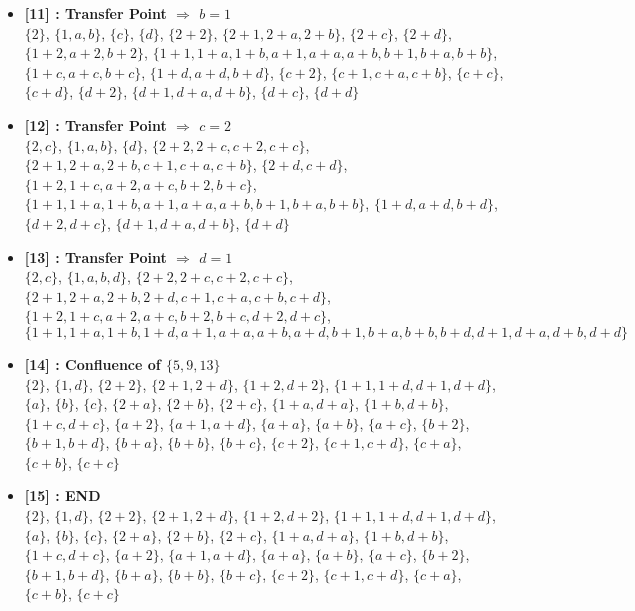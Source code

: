 \begin{itemize}
    \item \textbf{[11] : Transfer Point $\Rightarrow$ $b = 1$}\\
        $\{2\}$, $\{1, a, b\}$, $\{c\}$, $\{d\}$, $\{2 + 2\}$, $\{2 + 1, 2 + a, 2 + b\}$, $\{2 + c\}$, $\{2 + d\}$, $\{1 + 2, a + 2, b + 2\}$, $\{1 + 1, 1 + a, 1 + b, a + 1, a + a, a + b, b + 1, b + a, b + b\}$, $\{1 + c, a + c, b + c\}$, $\{1 + d, a + d, b + d\}$, $\{c + 2\}$, $\{c + 1, c + a, c + b\}$, $\{c + c\}$, $\{c + d\}$, $\{d + 2\}$, $\{d + 1, d + a, d + b\}$, $\{d + c\}$, $\{d + d\}$

    \item \textbf{[12] : Transfer Point $\Rightarrow$ $c = 2$}\\
        $\{2, c\}$, $\{1, a, b\}$, $\{d\}$, $\{2 + 2, 2 + c, c + 2, c + c\}$, $\{2 + 1, 2 + a, 2 + b, c + 1, c + a, c + b\}$, $\{2 + d, c + d\}$, $\{1 + 2, 1 + c, a + 2, a + c, b + 2, b + c\}$, $\{1 + 1, 1 + a, 1 + b, a + 1, a + a, a + b, b + 1, b + a, b + b\}$, $\{1 + d, a + d, b + d\}$, $\{d + 2, d + c\}$, $\{d + 1, d + a, d + b\}$, $\{d + d\}$

    \item \textbf{[13] : Transfer Point $\Rightarrow$ $d = 1$}\\
        $\{2, c\}$, $\{1, a, b, d\}$, $\{2 + 2, 2 + c, c + 2, c + c\}$, $\{2 + 1, 2 + a, 2 + b, 2 + d, c + 1, c + a, c + b, c + d\}$, $\{1 + 2, 1 + c, a + 2, a + c, b + 2, b + c, d + 2, d + c\}$, $\{1 + 1, 1 + a, 1 + b, 1 + d, a + 1, a + a, a + b, a + d, b + 1, b + a, b + b, b + d, d + 1, d + a, d + b, d + d\}$

    \item \textbf{[14] : Confluence of $\{5, 9, 13\}$}\\
        $\{2\}$, $\{1, d\}$, $\{2 + 2\}$, $\{2 + 1, 2 + d\}$, $\{1 + 2, d + 2\}$, $\{1 + 1, 1 + d, d + 1, d + d\}$, $\{a\}$, $\{b\}$, $\{c\}$, $\{2 + a\}$, $\{2 + b\}$, $\{2 + c\}$, $\{1 + a, d + a\}$, $\{1 + b, d + b\}$, $\{1 + c, d + c\}$, $\{a + 2\}$, $\{a + 1, a + d\}$, $\{a + a\}$, $\{a + b\}$, $\{a + c\}$, $\{b + 2\}$, $\{b + 1, b + d\}$, $\{b + a\}$, $\{b + b\}$, $\{b + c\}$, $\{c + 2\}$, $\{c + 1, c + d\}$, $\{c + a\}$, $\{c + b\}$, $\{c + c\}$

    \item \textbf{[15] : END}\\
        $\{2\}$, $\{1, d\}$, $\{2 + 2\}$, $\{2 + 1, 2 + d\}$, $\{1 + 2, d + 2\}$, $\{1 + 1, 1 + d, d + 1, d + d\}$, $\{a\}$, $\{b\}$, $\{c\}$, $\{2 + a\}$, $\{2 + b\}$, $\{2 + c\}$, $\{1 + a, d + a\}$, $\{1 + b, d + b\}$, $\{1 + c, d + c\}$, $\{a + 2\}$, $\{a + 1, a + d\}$, $\{a + a\}$, $\{a + b\}$, $\{a + c\}$, $\{b + 2\}$, $\{b + 1, b + d\}$, $\{b + a\}$, $\{b + b\}$, $\{b + c\}$, $\{c + 2\}$, $\{c + 1, c + d\}$, $\{c + a\}$, $\{c + b\}$, $\{c + c\}$

\end{itemize}

